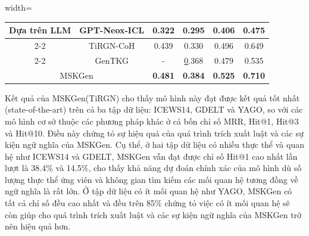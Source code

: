 \begin{table}[H]
\begin{adjustbox}{width=\textwidth}
\begin{tabular}{|cc|cccc|}
\multicolumn{1}{|c|}{\multirow{3}{*}{Dựa trên LLM}}    & GPT-Neox-ICL             & 0.322                    & 0.295                      & 0.406                      & 0.475          \\ \cline{2-2}
\multicolumn{1}{|c|}{}                                 & TiRGN-CoH                & 0.439                    & 0.330                      & 0.496                      & 0.649          \\ \cline{2-2}
\multicolumn{1}{|c|}{}                                 & GenTKG                   & -                        & {\ul 0.368}                & 0.479                      & 0.535          \\ \hline
\multicolumn{2}{|c|}{MSKGen}                                                      & \textbf{0.481}           & \textbf{0.384}             & \textbf{0.525}             & \textbf{0.710} \\ \hline
\end{tabular}
\end{adjustbox}  
\end{table}
\vspace{-5mm}

Kết quả của MSKGen(TiRGN) cho thấy mô hình này đạt được kết quả tốt nhất (state-of-the-art) trên cả ba tập dữ liệu: ICEWS14, GDELT và YAGO, so
với các mô hình cơ sở thuộc các phương pháp khác ở cả bốn chỉ số MRR, Hit@1, Hit@3 và Hit@10. Điều này chứng tỏ sự hiệu quả của quá trình 
trích xuất luật và các sự kiện ngữ nghĩa của MSKGen. Cụ thể, ở hai tập dữ liệu có nhiều thực thể và quan hệ như ICEWS14 và GDELT, MSKGen vẫn đạt
được chỉ số Hit@1 cao nhất lần lượt là 38.4\% và 14.5\%, cho thấy khả năng dự đoán chính xác của mô hình dù số lượng thực thể ứng viên và không gian tìm kiếm các mối quan hệ tương đồng về ngữ nghĩa là rất lớn.
Ở tập dữ liệu có ít mối quan hệ như YAGO, MSKGen có tất cả chỉ số đều cao nhất và đều trên 85\% chứng tỏ việc có ít mối quan hệ sẽ còn giúp cho quá trình trích xuất luật 
và các sự kiện ngữ nghĩa của MSKGen trở nên hiệu quả hơn.

